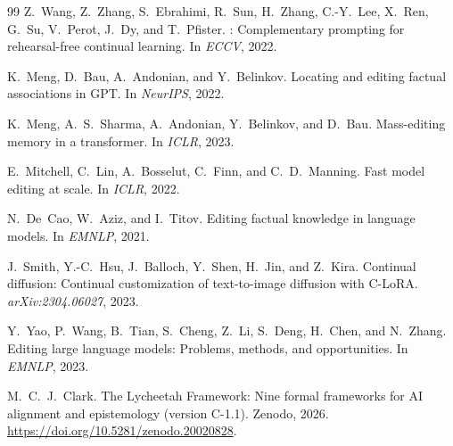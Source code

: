 \documentclass[11pt,a4paper]{article}
\theoremstyle{definition}
\begin{document}
\begin{thebibliography}{99}
Z.~Wang, Z.~Zhang, S.~Ebrahimi, R.~Sun, H.~Zhang, C.-Y.~Lee, X.~Ren, G.~Su,
  V.~Perot, J.~Dy, and T.~Pfister.
: Complementary prompting for rehearsal-free continual
  learning.
\newblock In \emph{ECCV}, 2022.

K.~Meng, D.~Bau, A.~Andonian, and Y.~Belinkov.
\newblock Locating and editing factual associations in {GPT}.
\newblock In \emph{NeurIPS}, 2022.

K.~Meng, A.~S.~Sharma, A.~Andonian, Y.~Belinkov, and D.~Bau.
\newblock Mass-editing memory in a transformer.
\newblock In \emph{ICLR}, 2023.

E.~Mitchell, C.~Lin, A.~Bosselut, C.~Finn, and C.~D.~Manning.
\newblock Fast model editing at scale.
\newblock In \emph{ICLR}, 2022.

N.~De~Cao, W.~Aziz, and I.~Titov.
\newblock Editing factual knowledge in language models.
\newblock In \emph{EMNLP}, 2021.

J.~Smith, Y.-C.~Hsu, J.~Balloch, Y.~Shen, H.~Jin, and Z.~Kira.
\newblock Continual diffusion: Continual customization of text-to-image
  diffusion with {C-LoRA}.
\newblock \emph{arXiv:2304.06027}, 2023.

Y.~Yao, P.~Wang, B.~Tian, S.~Cheng, Z.~Li, S.~Deng, H.~Chen, and N.~Zhang.
\newblock Editing large language models: Problems, methods, and opportunities.
\newblock In \emph{EMNLP}, 2023.

M.~C.~J.~Clark.
\newblock The Lycheetah Framework: Nine formal frameworks for {AI} alignment and epistemology (version {C-1.1}).
\newblock Zenodo, 2026.
\newblock \url{https://doi.org/10.5281/zenodo.20020828}.

\end{thebibliography}
\end{document}
